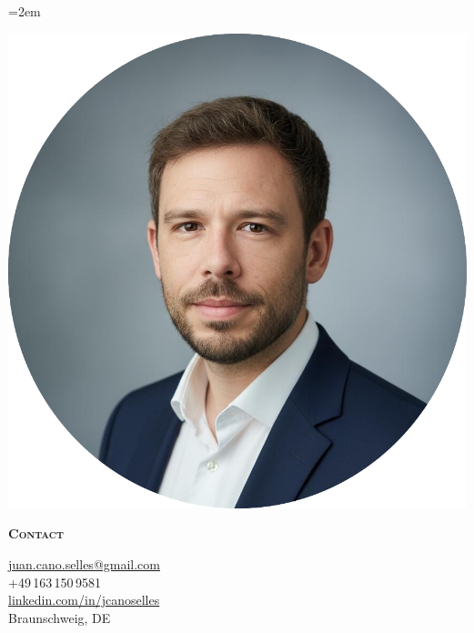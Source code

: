 \documentclass[11pt,a4paper]{article}
\newcommand{\headleft}[1]{\vspace*{2ex}\textsc{\textbf{\color{softwhite}#1}}\par%
  \vspace*{-1.2ex}{\color{softwhite}\hrulefill}\par\vspace*{0.7ex}}
\newlength{\SideBarW}
\begin{document}
\pagestyle{empty}
\sloppy
\emergencystretch=2em
\setlength{\parindent}{0pt}
\setlength{\parskip}{0pt}

\vspace*{-10mm}
\noindent\begin{minipage}[t]{\textwidth}

\colorbox{cvblue!90}{%
  \parbox[t][\textheight][t]{\SideBarW}{%
    \hspace*{4mm}%
    \begin{minipage}[t]{\dimexpr\linewidth-8mm\relax}
      \color{softwhite}
      \vspace*{6mm}
      \begin{center}
        \includegraphics[width=0.85\linewidth]{Resume_Juan_Cano.png}
      \end{center}

      \headleft{Contact}
      \small
      \href{mailto:juan.cano.selles@gmail.com}{juan.cano.selles@gmail.com} \\[0.6ex]
      +49\,163\,150\,9581 \\[0.6ex]
      \href{https://www.linkedin.com/in/jcanoselles}{linkedin.com/in/jcanoselles} \\[0.6ex]
      Braunschweig, DE
      \normalsize

      \vspace*{3mm} %


\end{minipage}}}
\end{minipage}
\end{document}
